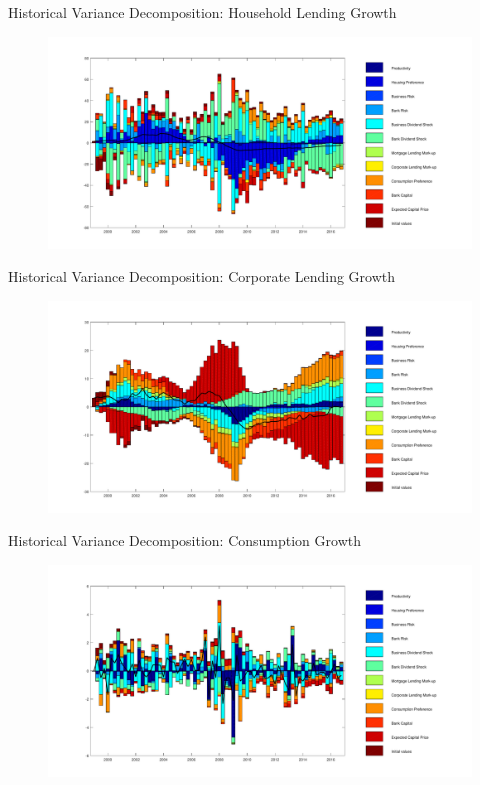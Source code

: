 \documentclass[8pt,aspectratio=169]{beamer}
\numberwithin{equation}{section}
\begin{document}
\begin{frame}{Historical Variance Decomposition: Household Lending Growth }

\begin{figure}
\includegraphics[scale=0.36]{decomp_dbm.pdf}
\end{figure}
\end{frame}



\begin{frame}{Historical Variance Decomposition: Corporate Lending Growth }

\begin{figure}
\includegraphics[scale=0.36]{decomp_dbe.pdf}
\end{figure}
\end{frame}


\begin{frame}{Historical Variance Decomposition: Consumption Growth }

\begin{figure}
\includegraphics[scale=0.36]{decomp_dc.pdf}
\end{figure}
\end{frame}
\end{document}
